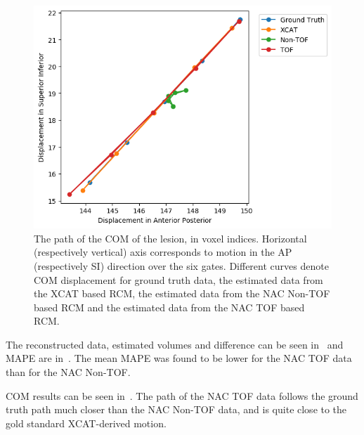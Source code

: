             \begin{figure}
                \centering
                
                \includegraphics[width=1.0\linewidth]{figures/motion_correction_1_results_1_TOF.png}
                
                \captionsetup{singlelinecheck=false}
                \caption{
                    The path of the \gls{COM} of the lesion, in voxel indices. Horizontal (respectively vertical) axis corresponds to motion in the \gls{AP} (respectively \gls{SI}) direction over the six gates. Different curves denote \gls{COM} displacement for ground truth data, the estimated data from the \gls{XCAT} based \gls{RCM}, the estimated data from the \gls{NAC} \gls{Non-TOF} based \gls{RCM} and the estimated data from the \gls{NAC} \gls{TOF} based \gls{RCM}.
                }
                \label{fig:impact_of_tof_on_respiratory_motion_model_estimation_using_pre_gated_no_intra_cycle_motion_nac_pet_results_com_graph}
            \end{figure}
            
             The reconstructed data, estimated volumes and difference can be seen in~ and \gls{MAPE} are in~. The mean \gls{MAPE} was found to be lower for the \gls{NAC} \gls{TOF} data than for the \gls{NAC} \gls{Non-TOF}.
            
             \gls{COM} results can be seen in~. The path of the \gls{NAC} \gls{TOF} data follows the ground truth path much closer than the \gls{NAC} \gls{Non-TOF} data, and is quite close to the gold standard \gls{XCAT}-derived motion.
            
